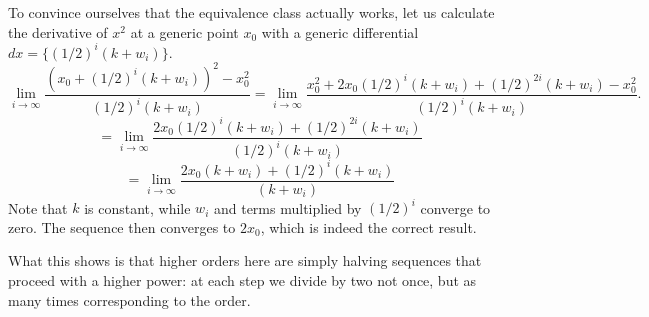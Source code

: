 \begin{remark}
	To convince ourselves that the equivalence class actually works, let us calculate the derivative of $x^2$ at a generic point $x_0$ with a generic differential $dx = \{(1/2)^i(k + w_i)\}$.
	$$ \lim\limits_{i \to \infty} \frac{(x_0 + (1/2)^i(k + w_i))^2 - x_0^2}{(1/2)^i(k + w_i)} = \lim\limits_{i \to \infty} \frac{x_0^2 + 2 x_0 (1/2)^i(k + w_i) + (1/2)^{2i}(k + w_i) - x_0^2}{(1/2)^i(k + w_i)}.$$
	$$= \lim\limits_{i \to \infty} \frac{2 x_0 (1/2)^i(k + w_i) + (1/2)^{2i}(k + w_i)}{(1/2)^i(k + w_i)}$$
	$$= \lim\limits_{i \to \infty} \frac{2 x_0 (k + w_i) + (1/2)^{i}(k + w_i)}{(k + w_i)}$$
	Note that $k$ is constant, while $w_i$ and terms multiplied by $(1/2)^{i}$ converge to zero. The sequence then converges to $2x_0$, which is indeed the correct result.
	
	What this shows is that higher orders here are simply halving sequences that proceed with a higher power: at each step we divide by two not once, but as many times corresponding to the order.
\end{remark}

